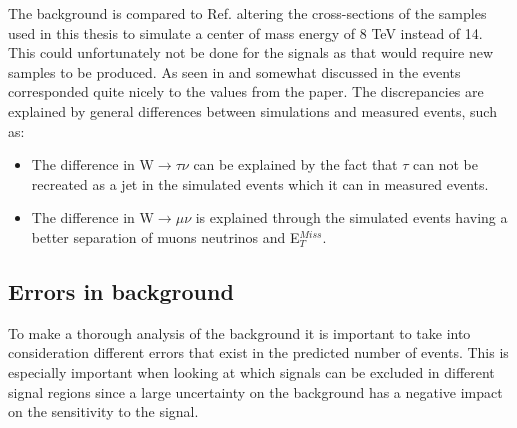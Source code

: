 The background is compared to Ref. \citep{ATLAS-CONF-2012-147} altering the cross-sections of the samples used in this thesis to simulate a center of mass energy of 8 TeV instead of 14. This could unfortunately not be done for the signals as that would require new samples to be produced. As seen in  and somewhat discussed in  the events corresponded quite nicely to the values from the paper. The discrepancies are explained by general differences between simulations and measured events, such as:
\begin{itemize}
\item The difference in W$\rightarrow\tau\nu$ can be explained by the fact that $\tau$ can not be recreated as a jet in the simulated events which it can in measured events.

\item The difference in W$\rightarrow\mu\nu$ is explained through the simulated events having a better separation of muons neutrinos and E$_T^{Miss}$.
\end{itemize}

\subsection{Errors in background}\label{subsec:errdata}
To make a thorough analysis of the background it is important to take into consideration different errors that exist in the predicted number of events. This is especially important when looking at which signals can be excluded in different signal regions since a large uncertainty on the background has a negative impact on the sensitivity to the signal.



